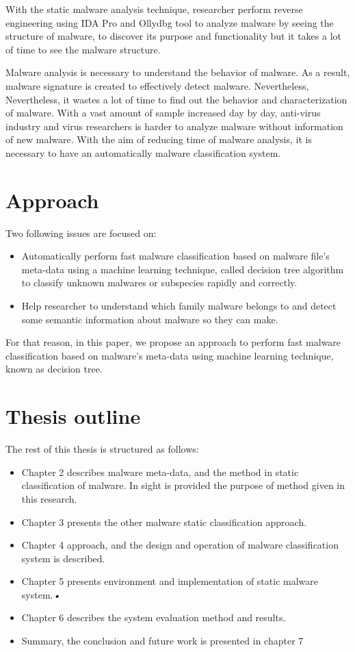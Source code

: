With the static malware analysis technique, researcher perform reverse engineering using IDA Pro and Ollydbg tool to analyze malware by seeing the structure of malware, to discover its purpose and functionality but it takes a lot of time to see the malware structure. 

Malware analysis is necessary to understand the behavior of malware. As a result, malware signature is created to effectively detect malware. Nevertheless, Nevertheless, it wastes a lot of time to find out the behavior and characterization of malware.
With a vast amount of sample increased day by day, anti-virus industry and virus researchers is harder to analyze malware without information of new malware. With the aim of reducing time of malware analysis, it is necessary to have an automatically malware classification system.


\section{Approach}Two following issues are focused on:
\begin{itemize}
\item Automatically perform fast malware classification based on malware file's meta-data using a machine learning technique, called decision tree algorithm to classify unknown malwares or subspecies rapidly and correctly.
\item Help researcher to understand which family malware belongs to and detect some semantic information about malware so they can make.
\end{itemize}

For that reason, in this paper, we propose an approach to perform fast malware classification based on malware's meta-data using machine learning technique, known as decision tree.

\section{Thesis outline}
The rest of this thesis is structured as follows: \begin{itemize}
\item Chapter 2 describes malware meta-data, and the method in static classification of malware. In sight is provided the purpose of method given in this research.
\item Chapter 3 presents the other malware static classification approach.
\item Chapter 4 approach, and the design and operation of malware classification system is described.
\item Chapter 5 presents environment and implementation of static malware system.\textsl{•} 
\item Chapter 6 describes the system evaluation method and results. 
\item Summary, the conclusion and future work is presented in chapter 7
\end{itemize}
